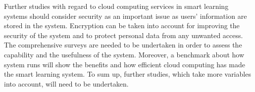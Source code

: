 \documentclass[journal]{vgtc}
\begin{document}
Further studies with regard to cloud computing services in smart learning systems should consider security as an important issue as users' information are stored in the system. Encryption can be taken into account for improving the security of the system and to protect personal data from any unwanted access. The comprehensive surveys are needed to be undertaken in order to assess the capability and the usefulness of the system. Moreover, a benchmark about how system runs will show the benefits and how efficient cloud computing has made the smart learning system. To sum up, further studies, which take more variables into account, will need to be undertaken.




\end{document}
